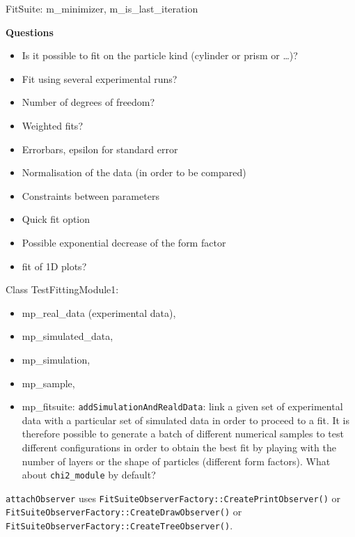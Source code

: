 FitSuite: m\_minimizer, m\_is\_last\_iteration

\textbf{Questions}
\begin{itemize}
\item Is it possible to fit on the particle kind (cylinder or prism or
\ldots)?
\item Fit using several experimental runs?
\item Number of degrees of freedom?
\item Weighted fits?
\item Errorbars, epsilon for standard error
\item Normalisation of the data (in order to be compared)
\item Constraints between parameters
\item Quick fit option
\item Possible exponential decrease of the form factor
\item fit of 1D plots?
\end{itemize}


Class TestFittingModule1: 
\begin{itemize}
\item mp\_real\_data (experimental data), 
\item mp\_simulated\_data,
\item mp\_simulation, 
\item mp\_sample, 
\item mp\_fitsuite: \texttt{addSimulationAndRealdData}: link a given set of experimental data with a
  particular set of simulated data in order to proceed to a fit. It is
  therefore possible to generate a batch of different numerical
  samples to test different configurations in order to obtain the best
  fit by playing with the number of layers or the shape of particles
  (different form factors). What about \texttt{chi2\_module} by default?
\end{itemize} 

\texttt{attachObserver} uses
\texttt{FitSuiteObserverFactory::CreatePrintObserver()} or
\texttt{FitSuiteObserverFactory::CreateDrawObserver()} or
\texttt{FitSuiteObserverFactory::CreateTreeObserver()}.


